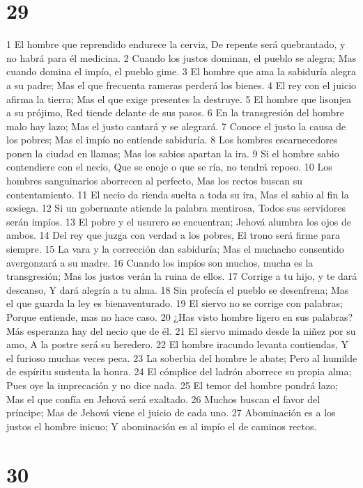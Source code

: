 \chapter{29}

1 El hombre que reprendido endurece la cerviz,
De repente será quebrantado, y no habrá para él medicina.
2 Cuando los justos dominan, el pueblo se alegra;
Mas cuando domina el impío, el pueblo gime.
3 El hombre que ama la sabiduría alegra a su padre;
Mas el que frecuenta rameras perderá los bienes.
4 El rey con el juicio afirma la tierra;
Mas el que exige presentes la destruye.
5 El hombre que lisonjea a su prójimo,
Red tiende delante de sus pasos.
6 En la transgresión del hombre malo hay lazo;
Mas el justo cantará y se alegrará.
7 Conoce el justo la causa de los pobres;
Mas el impío no entiende sabiduría.
8 Los hombres escarnecedores ponen la ciudad en llamas;
Mas los sabios apartan la ira.
9 Si el hombre sabio contendiere con el necio,
Que se enoje o que se ría, no tendrá reposo.
10 Los hombres sanguinarios aborrecen al perfecto,
Mas los rectos buscan su contentamiento.
11 El necio da rienda suelta a toda su ira,
Mas el sabio al fin la sosiega.
12 Si un gobernante atiende la palabra mentirosa,
Todos sus servidores serán impíos.
13 El pobre y el usurero se encuentran;
Jehová alumbra los ojos de ambos.
14 Del rey que juzga con verdad a los pobres,
El trono será firme para siempre.
15 La vara y la corrección dan sabiduría;
Mas el muchacho consentido avergonzará a su madre.
16 Cuando los impíos son muchos, mucha es la transgresión;
Mas los justos verán la ruina de ellos.
17 Corrige a tu hijo, y te dará descanso,
Y dará alegría a tu alma.
18 Sin profecía el pueblo se desenfrena;
Mas el que guarda la ley es bienaventurado.
19 El siervo no se corrige con palabras;
Porque entiende, mas no hace caso.
20 ¿Has visto hombre ligero en sus palabras?
Más esperanza hay del necio que de él.
21 El siervo mimado desde la niñez por su amo,
A la postre será su heredero.
22 El hombre iracundo levanta contiendas,
Y el furioso muchas veces peca.
23 La soberbia del hombre le abate;
Pero al humilde de espíritu sustenta la honra.
24 El cómplice del ladrón aborrece su propia alma;
Pues oye la imprecación y no dice nada.
25 El temor del hombre pondrá lazo;
Mas el que confía en Jehová será exaltado.
26 Muchos buscan el favor del príncipe;
Mas de Jehová viene el juicio de cada uno.
27 Abominación es a los justos el hombre inicuo;
Y abominación es al impío el de caminos rectos. 

\chapter{30}

